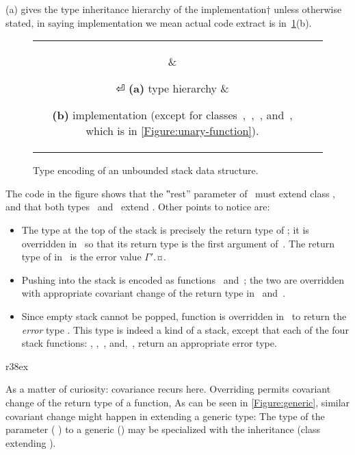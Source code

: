 (a) gives the type inheritance hierarchy of the \Java
implementation†{%
  unless otherwise stated, in saying implementation we mean actual
  code extract
}
is in~\cref{Figure:stack-encoding}(b).

\begin{figure}[H]
  \caption{Type encoding of an unbounded stack data structure.}
  \label{Figure:stack-encoding}
  \begin{tabular}{cc}
    \parbox[c]{0.3\linewidth}{%
      
    } &
    \hspace{-3ex} \parbox[c]{63ex}{}⏎
    \textbf{(a)} type hierarchy &
    \hspace{-3ex} \parbox[t]{63ex}{%
    \textbf{(b)} implementation (except
    for classes~,~,~, and~, which is in \cref{Figure:unary-function}).}
  \end{tabular}
\end{figure}

The code in the figure shows that the ‟rest” parameter of~ must extend class ,
  and that both types~ and~ extend .
Other points to notice are:
\begin{itemize}
  \item The type at the top of the stack is precisely the return type of ;
        it is overridden in~ so that its return type is the first argument of~.
        The return type of  in~ is the error value {$Γ'$.¤}.
  \item Pushing into the stack is encoded as functions~ and~;
        the two are overridden with appropriate covariant change of the return type in~ and~.

  \item Since empty stack cannot be popped, function  is overridden in~ to return
    the \emph{error} type . This type is indeed a kind of a stack, except that each of the four stack
        functions: , ,~, and,~, return an appropriate error type.
\end{itemize}

\begin{wrapfigure}[5]r{38ex}
  \caption{\label{Figure:generic} Covariance with generics}
\end{wrapfigure}
As a matter of curiosity: covariance recurs here.
Overriding permits covariant change of the return type of a function,
As can be seen in \cref{Figure:generic}, similar covariant change might happen in extending a generic type:
The type of the parameter ( ) to a generic () may
be specialized with the inheritance (class  extending ).

